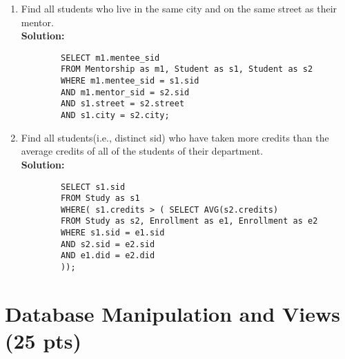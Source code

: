 \documentclass[paper=a4, fontsize=11pt]{scrartcl}
\numberwithin{equation}{section}		%
\numberwithin{figure}{section}			%
\numberwithin{table}{section}				%
\begin{document}
	\begin{enumerate}
		\item Find all students who live in the same city and on the same street as their mentor.\\
		\textbf{Solution: }
		\begin{lstlisting}
		SELECT m1.mentee_sid
		FROM Mentorship as m1, Student as s1, Student as s2
		WHERE m1.mentee_sid = s1.sid
		AND m1.mentor_sid = s2.sid
		AND s1.street = s2.street
		AND s1.city = s2.city;
		\end{lstlisting}
		
		
		\item Find all students(i.e., distinct sid) who have taken more credits than the average credits of all of the students of their department.\\
		\textbf{Solution: }
		\begin{lstlisting}
		SELECT s1.sid
		FROM Study as s1
		WHERE( s1.credits > ( SELECT AVG(s2.credits)
		FROM Study as s2, Enrollment as e1, Enrollment as e2
		WHERE s1.sid = e1.sid
		AND s2.sid = e2.sid
		AND e1.did = e2.did
		));
		\end{lstlisting}
		
		
	\end{enumerate}
	
	
	\section{Database Manipulation and Views (25 pts)}
	
\end{document}
